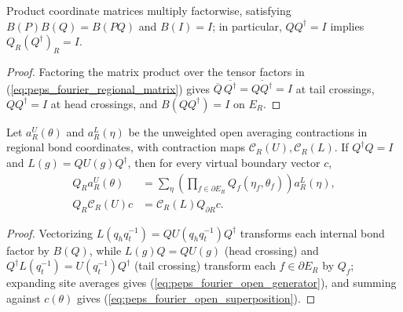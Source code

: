 \begin{lemma}%
    \label{thm:peps_fourier_product_composition}
    \leanok
    Product coordinate matrices multiply factorwise, satisfying $B(P)B(Q)=B(PQ)$ and $B(I)=I$; in particular, $QQ^\dagger=I$ implies $Q_R(Q^\dagger)_R=I$.
\end{lemma}
\begin{proof}\leanok
    Factoring the matrix product over the tensor factors in (\ref{eq:peps_fourier_regional_matrix}) gives $\overline Q\,\overline{Q^\dagger}=\overline{QQ^\dagger}=I$ at tail crossings, $QQ^\dagger=I$ at head crossings, and $B(QQ^\dagger)=I$ on $E_R$.
\end{proof}

\begin{lemma}%
    \label{thm:peps_fourier_open_contractions}
    \leanok
    Let $a_R^U(\theta)$ and $a_R^L(\eta)$ be the unweighted open averaging contractions in regional bond coordinates, with contraction maps $\mathcal C_R(U),\mathcal C_R(L)$.
    If $Q^\dagger Q=I$ and $L(g)=QU(g)Q^\dagger$, then for every virtual boundary vector $c$,
    \begin{align}
        Q_Ra_R^U(\theta)
                            & =\sum_\eta\left(\prod_{f\in\partial E_R}
        Q_f(\eta_f,\theta_f)\right)a_R^L(\eta),
        \label{eq:peps_fourier_open_generator}                         \\
        Q_R\mathcal C_R(U)c & =\mathcal C_R(L)Q_{\partial R}c.
        \label{eq:peps_fourier_open_superposition}
    \end{align}
\end{lemma}
\begin{proof}\leanok
    Vectorizing $L(q_hq_t^{-1})=QU(q_hq_t^{-1})Q^\dagger$ transforms each internal bond factor by $B(Q)$, while $L(g)Q=QU(g)$ (head crossing) and $Q^\dagger L(q_t^{-1})=U(q_t^{-1})Q^\dagger$ (tail crossing) transform each $f\in\partial E_R$ by $Q_f$; expanding site averages gives (\ref{eq:peps_fourier_open_generator}), and summing against $c(\theta)$ gives (\ref{eq:peps_fourier_open_superposition}).
\end{proof}

